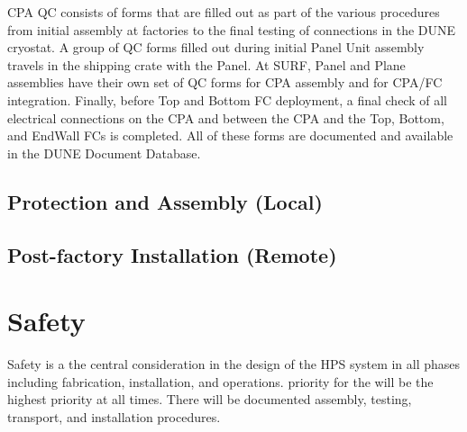 CPA QC consists of forms that are filled out as part of the various procedures from initial assembly at factories to the final testing of connections in the DUNE cryostat.  A group of QC forms filled out during initial Panel Unit assembly travels in the shipping crate with the Panel.  At SURF, Panel and Plane assemblies have their own set of QC forms for CPA assembly and for CPA/FC integration.  Finally, before Top and Bottom FC deployment, a final check of all electrical connections on the CPA and between the CPA and the Top, Bottom, and EndWall FCs is completed.  All of these forms are documented and available in the DUNE Document Database.

\subsection{Protection and Assembly (Local)}
\label{sec:fddp-hv-qc-local}


\subsection{Post-factory Installation (Remote)}
\label{sec:fddp-hv-qc-remote}





\section{Safety}

Safety is a the central consideration in the design of the HPS system in all phases including fabrication, installation, and operations. priority for the will be the highest priority at all times. There will be documented assembly, testing, transport, and installation procedures.

\label{sec:fddp-hv-safety}






